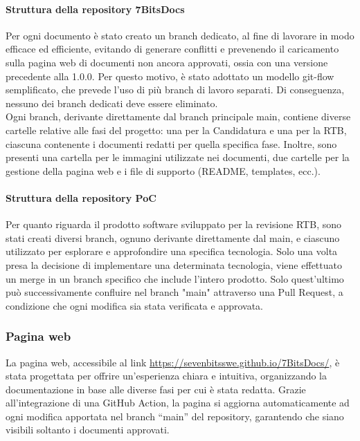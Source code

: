 \documentclass[10pt]{article}
\begin{document}
\begin{justify}
        \paragraph{Struttura della repository 7BitsDocs}
        Per ogni documento è stato creato un branch dedicato, al fine di lavorare in modo efficace ed efficiente, evitando di generare conflitti e prevenendo il caricamento sulla pagina web di documenti non ancora approvati, ossia con una versione precedente alla 1.0.0. Per questo motivo, è stato adottato un modello git-flow semplificato, che prevede l'uso di più branch di lavoro separati. Di conseguenza, nessuno dei branch dedicati deve essere eliminato.\\
        Ogni branch, derivante direttamente dal branch principale main, contiene diverse cartelle relative alle fasi del progetto: una per la Candidatura e una per la RTB, ciascuna contenente i documenti redatti per quella specifica fase. Inoltre, sono presenti una cartella per le immagini utilizzate nei documenti, due cartelle per la gestione della pagina web e i file di supporto (README, templates, ecc.).

        \paragraph{Struttura della repository PoC}
        Per quanto riguarda il prodotto software sviluppato per la revisione RTB, sono stati creati diversi branch, ognuno derivante direttamente dal main, e ciascuno utilizzato per esplorare e approfondire una specifica tecnologia. Solo una volta presa la decisione di implementare una determinata tecnologia, viene effettuato un merge in un branch specifico che include l'intero prodotto. Solo quest'ultimo può successivamente confluire nel branch "main" attraverso una Pull Request, a condizione che ogni modifica sia stata verificata e approvata.
    
    \subsubsection{Pagina web} 
    La pagina web, accessibile al link \href{https://sevenbitsswe.github.io/7BitsDocs/}{https://sevenbitsswe.github.io/7BitsDocs/}, è stata progettata per offrire un’esperienza chiara e intuitiva, organizzando la documentazione in base alle diverse fasi per cui è stata redatta. Grazie all’integrazione di una GitHub Action, la pagina si aggiorna automaticamente ad ogni modifica apportata nel branch “main” del repository, garantendo che siano visibili soltanto i documenti approvati.


\end{justify}
\end{document}
